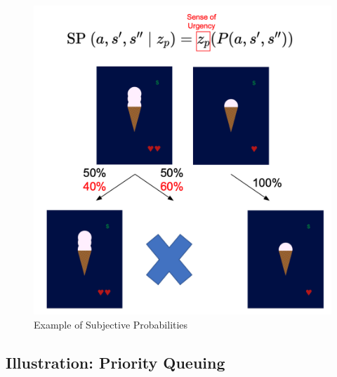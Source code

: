 \begin{figure}
\begin{minipage}[t]{0.50\linewidth}
{{\includegraphics{images/sense-urgency-illustration.png}

}

}

\end{minipage}%

\caption{\label{fig-prob-weighting}Example of Subjective Probabilities}

\end{figure}

\hypertarget{illustration-priority-queuing}{%
\subsection{Illustration: Priority
Queuing}\label{illustration-priority-queuing}}

